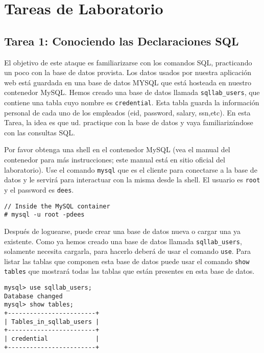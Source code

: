 \section{Tareas de Laboratorio}



\subsection{Tarea 1: Conociendo las Declaraciones SQL}
\label{ssec:MySQLConsole}

El objetivo de este ataque es familiarizarse con los comandos SQL, practicando un poco con la base de datos provista. Los datos usados por nuestra aplicación web está guardada en una base de datos MYSQL que está hosteada en nuestro contenedor MySQL.
Hemos creado una base de datos llamada \texttt{sqllab\_users}, que contiene una tabla cuyo nombre es {\tt credential}. Esta tabla guarda la información personal de cada uno de los empleados (eid, password, salary, ssn,etc). En esta Tarea, la idea es que ud. practique con la base de datos y vaya familiarizándose con las consultas SQL.

Por favor obtenga una shell en el contenedor MySQL (vea el manual del contenedor para más instrucciones; este manual está en sitio oficial del laboratorio).
Use el comando \texttt{mysql} que es el cliente para conectarse a la base de datos y le servirá para interactuar con la misma desde la shell.
El usuario es {\tt root} y el password es {\tt dees}. 

	
\begin{lstlisting}
// Inside the MySQL container
# mysql -u root -pdees 
\end{lstlisting}

Después de loguearse, puede crear una base de datos nueva o cargar una ya existente. Como ya hemos creado una base de datos llamada \texttt{sqllab\_users}, solamente necesita cargarla, para hacerlo deberá de usar el comando \texttt{use}.
Para listar las tablas que componen esta base de datos puede usar el comando  \texttt{show tables} que mostrará todas las tablas que están presentes en esta base de datos.

\begin{lstlisting}
mysql> use sqllab_users;
Database changed
mysql> show tables;
+------------------------+
| Tables_in_sqllab_users |
+------------------------+
| credential             |
+------------------------+
\end{lstlisting}

